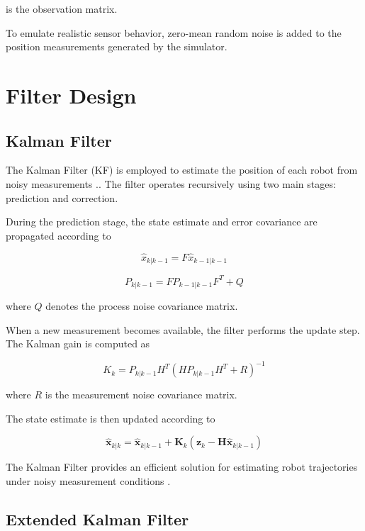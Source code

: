 \documentclass[conference]{IEEEtran}
\begin{document}
is the observation matrix.

To emulate realistic sensor behavior, zero-mean random noise is added to the position measurements generated by the simulator.

\section{Filter Design}

\subsection{Kalman Filter}

The Kalman Filter (KF) is employed to estimate the position of each robot from noisy measurements \cite{kalman,welch}.. The filter operates recursively using two main stages: prediction and correction.

During the prediction stage, the state estimate and error covariance are propagated according to

\begin{equation}
\hat{x}_{k|k-1}=F\hat{x}_{k-1|k-1}
\end{equation}

\begin{equation}
P_{k|k-1}=FP_{k-1|k-1}F^T+Q
\end{equation}

where \(Q\) denotes the process noise covariance matrix.

When a new measurement becomes available, the filter performs the update step. The Kalman gain is computed as

\begin{equation}
K_k=P_{k|k-1}H^T(HP_{k|k-1}H^T+R)^{-1}
\end{equation}

where \(R\) is the measurement noise covariance matrix.

The state estimate is then updated according to

\begin{equation}
\hat{\mathbf{x}}_{k|k}
=
\hat{\mathbf{x}}_{k|k-1}
+
\mathbf{K}_k
\left(
\mathbf{z}_k
-
\mathbf{H}
\hat{\mathbf{x}}_{k|k-1}
\right)
\end{equation}

The Kalman Filter provides an efficient solution for estimating robot trajectories under noisy measurement conditions \cite{maybeck,simon}.

\subsection{Extended Kalman Filter}
\end{document}
